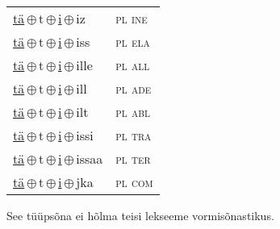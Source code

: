 \begin{minipage}{\textwidth}
\begin{sideways}
\begin{tabular}{l l}
\underline{tä}\,$\oplus$\,t\,$\oplus$\,\underline{i}\,$\oplus$\,iz & \textsc{ pl ine } \\
\underline{tä}\,$\oplus$\,t\,$\oplus$\,\underline{i}\,$\oplus$\,iss & \textsc{ pl ela } \\
\underline{tä}\,$\oplus$\,t\,$\oplus$\,\underline{i}\,$\oplus$\,ille & \textsc{ pl all } \\
\underline{tä}\,$\oplus$\,t\,$\oplus$\,\underline{i}\,$\oplus$\,ill & \textsc{ pl ade } \\
\underline{tä}\,$\oplus$\,t\,$\oplus$\,\underline{i}\,$\oplus$\,ilt & \textsc{ pl abl } \\
\underline{tä}\,$\oplus$\,t\,$\oplus$\,\underline{i}\,$\oplus$\,issi & \textsc{ pl tra } \\
\underline{tä}\,$\oplus$\,t\,$\oplus$\,\underline{i}\,$\oplus$\,issaa & \textsc{ pl ter } \\
\underline{tä}\,$\oplus$\,t\,$\oplus$\,\underline{i}\,$\oplus$\,jka & \textsc{ pl com } \\
\end{tabular}
\end{sideways}
\label{tab:tüüpsõnamall-täti}

\end{minipage}

 
\vspace{1em}
\noindent See tüüpsõna ei hõlma teisi lekseeme vormi\-sõnastikus.
